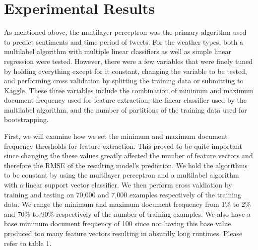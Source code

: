 \documentclass{article}
\begin{document}
\section{Experimental Results}
As mentioned above, the multilayer perceptron was the primary algorithm used to predict sentiments and time period of tweets. For the weather types, both a multilabel algorithm with multiple linear classifiers as well as simple linear regression were tested. However, there were a few variables that were finely tuned by holding everything except for it constant, changing the variable to be tested, and performing cross validation by splitting the training data or submitting to Kaggle. These three variables include the combination of minimum and maximum document frequency used for feature extraction, the linear classifier used by the multilabel algorithm, and the number of partitions of the training data used for bootstrapping.

First, we will examine how we set the minimum and maximum document frequency thresholds for feature extraction. This proved to be quite important since changing the these values greatly affected the number of feature vectors and therefore the RMSE of the resulting model's prediction. We hold the algorithms to be constant by using the multilayer perceptron and a multilabel algorithm with a linear support vector classifier. We then perform cross valdiation by training and testing on 70,000 and 7,000 examples respectively of the training data. We range the minimum and maximum document frequency from 1\% to 2\% and 70\% to 90\% respectively of the number of training examples. We also have a base minimum document frequency of 100 since not having this base value produced too many feature vectors resulting in absurdly long runtimes. Please refer to table 1.
\end{document}
